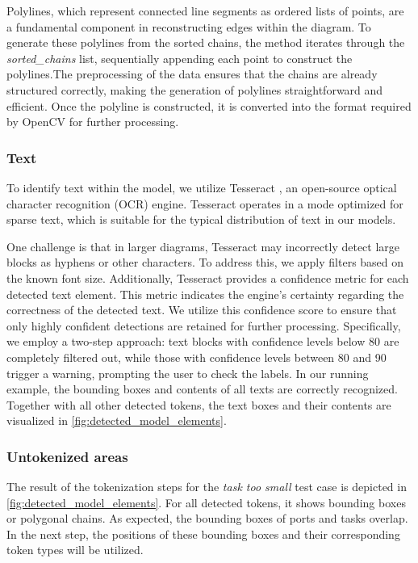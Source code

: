 Polylines, which represent connected line segments as ordered lists of points, are a fundamental component in reconstructing edges within the diagram. To generate these polylines from the sorted chains, the method iterates through the \textit{sorted\_chains} list, sequentially appending each point to construct the polylines.The preprocessing of the data ensures that the chains are already structured correctly, making the generation of polylines straightforward and efficient. Once the polyline is constructed, it is converted into the format required by OpenCV for further processing.

\subsubsection{Text}
To identify text within the model, we utilize Tesseract \cite{Smith2007}, an open-source optical character recognition (OCR) engine. Tesseract operates in a mode optimized for sparse text, which is suitable for the typical distribution of text in our models.

One challenge is that in larger diagrams, Tesseract may incorrectly detect large blocks as hyphens or other characters. To address this, we apply filters based on the known font size. 
Additionally, Tesseract provides a confidence metric for each detected text element. This metric indicates the engine's certainty regarding the correctness of the detected text. We utilize this confidence score to ensure that only highly confident detections are retained for further processing. Specifically, we employ a two-step approach: text blocks with confidence levels below 80 are completely filtered out, while those with confidence levels between 80 and 90 trigger a warning, prompting the user to check the labels. 
In our running example, the bounding boxes and contents of all texts are correctly recognized. Together with all other detected tokens, the text boxes and their contents are visualized in \autoref{fig:detected_model_elements}.

\subsubsection{Untokenized areas}
The result of the tokenization steps for the \emph{task too small} test case is depicted in \autoref{fig:detected_model_elements}. For all detected tokens, it shows bounding boxes or polygonal chains. As expected, the bounding boxes of ports and tasks overlap.  In the next step, the positions of these bounding boxes and their corresponding token types will be utilized. 

